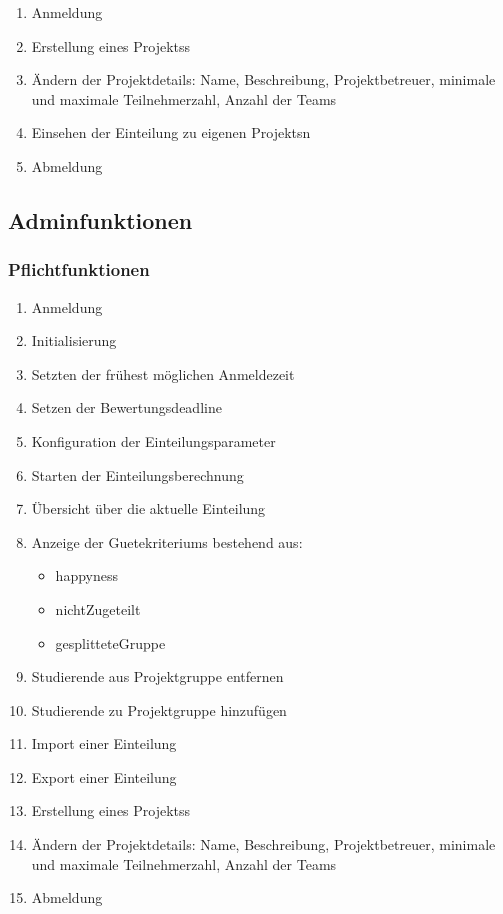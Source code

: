\documentclass[parskip=full]{scrartcl}
\newcommand{\swtLabel}[1]{\textbf{/#1\arabic*0/}}
\begin{document}
\begin{enumerate}[label=\swtLabel{FA}, resume]
  \item Anmeldung
  \item Erstellung eines \glspl{Projekt}s
  \item Ändern der Projektdetails: Name, Beschreibung, Projektbetreuer,
        minimale und maximale Teilnehmerzahl, Anzahl der Teams %
  \item Einsehen der Einteilung zu eigenen \glspl{Projekt}n
  \item Abmeldung
\end{enumerate}

\subsection{Adminfunktionen}

\subsubsection{Pflichtfunktionen}

\begin{enumerate}[label=\swtLabel{FA}, resume]
  \item Anmeldung
  \item Initialisierung \label{FAinit}
  \item Setzten der frühest möglichen Anmeldezeit
  \item Setzen der Bewertungsdeadline
  \item Konfiguration der Einteilungsparameter %
  \item Starten der Einteilungsberechnung
  \item Übersicht über die aktuelle Einteilung
  \item Anzeige der \glspl{Guetekriterium} bestehend aus:
    \begin{itemize}
      \item \gls{happyness}
      \item \gls{nichtZugeteilt}
      \item \gls{gesplitteteGruppe}
    \end{itemize}
  \item Studierende aus Projektgruppe entfernen
  \item Studierende zu Projektgruppe hinzufügen
  \item Import einer Einteilung \label{FAimport}
  \item Export einer Einteilung \label{FAexport}
  \item Erstellung eines \glspl{Projekt}s
  \item Ändern der Projektdetails: Name, Beschreibung, Projektbetreuer, %
        minimale und maximale Teilnehmerzahl, Anzahl der Teams
  \item Abmeldung
\end{enumerate}
\end{document}
